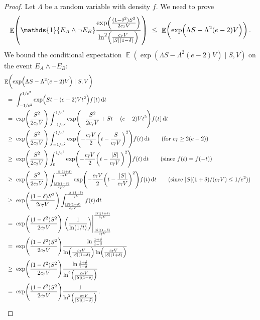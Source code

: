 \documentclass[11pt]{article}
\DeclareMathOperator{\E}{\mathbb{E}}
\theoremstyle{remark}
\theoremstyle{definition}
\newcommand\parens[1]{(#1)}
\newcommand\ind[1]{\ensuremath{\mathds{1}\{#1\}}}
\newcommand\Parens[1]{\mleft(#1\mright)}
\begin{document}
\begin{proof}
  Let $\Lambda$ be a random variable with density $f$.
  We need to prove
  \[
    \E\Parens{
      \ind{E_A \wedge \neg E_B}
      \frac{
        \exp\Parens{\frac{(1-\delta^2)S^2}{2c_7V}}
      }{
        \ln^2\Parens{\frac{c_7V}{|S|(1-\delta)}}
      }
    }
    \ \leq \
    \E\Parens{
      \exp\Parens{ \Lambda S - \Lambda^2 (e-2) V }
    }
    \,.
  \]
  We bound the conditional expectation $\E\parens{ \exp\parens{
  \Lambda S - \Lambda^2 (e-2) V } \mid S,V}$ on the event $E_A \wedge
  \neg E_B$:
  \begin{align*}
    \lefteqn{
      \E\Parens{
        \exp\Parens{ \Lambda S - \Lambda^2 (e-2) V }
        \mid S,V
      }
    } \\
    & \ = \
    \int_{-1/e^2}^{1/e^2}
    \exp\Parens{ S t - (e-2) V t^2 }
    f(t) \dif{t}
    \\
    & \ = \
    \exp\Parens{\frac{S^2}{2c_7V}}
    \int_{-1/e^2}^{1/e^2}
    \exp\Parens{
      -\frac{S^2}{2c_7V}
      + S t - (e-2) V t^2
    }
    f(t) \dif{t}
    \\
    & \ \geq \
    \exp\Parens{\frac{S^2}{2c_7V}}
    \int_{-1/e^2}^{1/e^2}
    \exp\Parens{
      -\frac{c_7V}{2}
      \Parens{ t - \frac{S}{c_7V} }^2
    }
    f(t) \dif{t}
    \qquad \text{(for $c_7 \geq 2(e-2)$)}
    \\
    & \ \geq \
    \exp\Parens{\frac{S^2}{2c_7V}}
    \int_0^{1/e^2}
    \exp\Parens{
      -\frac{c_7V}{2}
      \Parens{ t - \frac{|S|}{c_7V} }^2
    }
    f(t) \dif{t}
    \qquad \text{(since $f(t) = f(-t)$)}
    \\
    & \ \geq \
    \exp\Parens{\frac{S^2}{2c_7V}}
    \int_{\frac{|S|(1-\delta)}{c_7V}}^{\frac{|S|(1+\delta)}{c_7V}}
    \exp\Parens{
      -\frac{c_7V}{2}
      \Parens{ t - \frac{|S|}{c_7V} }^2
    }
    f(t) \dif{t}
    \qquad \text{(since $|S|(1+\delta)/(c_7V) \leq 1/e^2)$)}
    \\
    & \ \geq \
    \exp\Parens{\frac{(1-\delta)S^2}{2c_7V}}
    \int_{\frac{|S|(1-\delta)}{c_7V}}^{\frac{|S|(1+\delta)}{c_7V}}
    f(t) \dif{t}
    \\
    & \ = \
    \exp\Parens{\frac{(1-\delta^2)S^2}{2c_7V}}
    \left.
    \Parens{
      \frac{1}{\ln(1/t)}
    }
    \right\vert_{\frac{|S|(1-\delta)}{c_7V}}^{\frac{|S|(1+\delta)}{c_7V}}
    \\
    & \ = \
    \exp\Parens{\frac{(1-\delta^2)S^2}{2c_7V}}
    \frac{\ln\frac{1+\delta}{1-\delta}}
    {\ln\Parens{\frac{c_7V}{|S|(1-\delta)}}\ln\Parens{\frac{c_7V}{|S|(1+\delta)}}}
    \\
    & \ \geq \
    \exp\Parens{\frac{(1-\delta^2)S^2}{2c_7V}}
    \frac{\ln\frac{1+\delta}{1-\delta}}
    {\ln^2\Parens{\frac{c_7V}{|S|(1-\delta)}}}
    \\
    & \ = \
    \exp\Parens{\frac{(1-\delta^2)S^2}{2c_7V}}
    \frac{1}{\ln^2\Parens{\frac{c_7V}{|S|(1-\delta)}}}
    \,.
    \qedhere
  \end{align*}
\end{proof}
\end{document}
